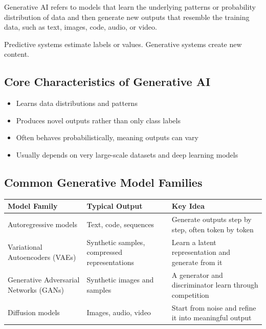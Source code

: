 \documentclass[11pt,a4paper]{article}
\begin{document}
\begin{definitionbox}[Generative AI]
Generative AI refers to models that learn the underlying patterns or probability distribution of data and then generate new outputs that resemble the training data, such as text, images, code, audio, or video.
\end{definitionbox}

\begin{conceptbox}
Predictive systems estimate labels or values. Generative systems create new content.
\end{conceptbox}

\subsection{Core Characteristics of Generative AI}

\begin{itemize}[leftmargin=*]
  \item Learns data distributions and patterns
  \item Produces novel outputs rather than only class labels
  \item Often behaves probabilistically, meaning outputs can vary
  \item Usually depends on very large-scale datasets and deep learning models
\end{itemize}

\subsection{Common Generative Model Families}

\begin{longtable}{@{}p{3.1cm}p{3.6cm}p{6.3cm}@{}}
\toprule
\rowcolor{primary!15}
\textbf{Model Family} & \textbf{Typical Output} & \textbf{Key Idea} \\
\midrule
\endhead
Autoregressive models & Text, code, sequences & Generate outputs step by step, often token by token \\
\addlinespace
Variational Autoencoders (VAEs) & Synthetic samples, compressed representations & Learn a latent representation and generate from it \\
\addlinespace
Generative Adversarial Networks (GANs) & Synthetic images and samples & A generator and discriminator learn through competition \\
\addlinespace
Diffusion models & Images, audio, video & Start from noise and refine it into meaningful output \\
\bottomrule
\end{longtable}
\end{document}
